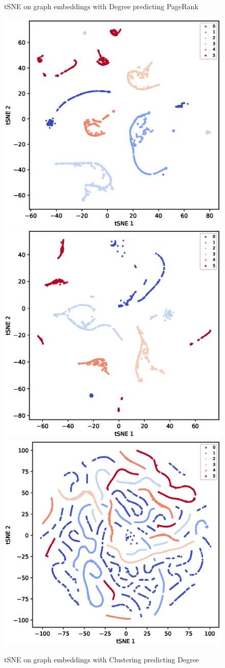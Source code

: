 \documentclass[sigconf]{acmart}
\begin{document}
\begin{figure}[htb]
\begin{center}
    \caption{tSNE on graph embeddings with Degree predicting PageRank}
  \hspace*{-1.5in}
    \includegraphics[width=0.35\linewidth]{fig/Cora_2to1_tSNE.eps}
    \includegraphics[width=0.35\linewidth]{fig/Citeseer_2to1_tSNE.eps}
    \includegraphics[width=0.35\linewidth]{fig/PubMed_2to1_tSNE.eps}
    \hspace*{-1.5in}

    \caption{tSNE on graph embeddings with Clustering predicting Degree}
\end{center}
\end{figure}
\end{document}
